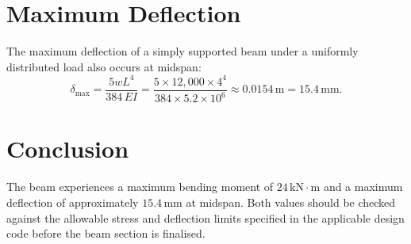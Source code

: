 \documentclass[12pt, letterpaper]{article} %
\begin{document}
\section{Maximum Deflection}

The maximum deflection of a simply supported beam under a uniformly
distributed load also occurs at midspan:
\[
  \delta_{\max} = \frac{5wL^4}{384\,EI}
  = \frac{5 \times 12{,}000 \times 4^4}{384 \times 5.2 \times 10^{6}}
  \approx 0.0154\,\text{m} = 15.4\,\text{mm}.
\]

\section{Conclusion}

The beam experiences a maximum bending moment of $24\,\text{kN}\cdot
\text{m}$ and a maximum deflection of approximately $15.4\,\text{mm}$ at
midspan. Both values should be checked against the allowable stress and
deflection limits specified in the applicable design code before the
beam section is finalised.
\end{document}
